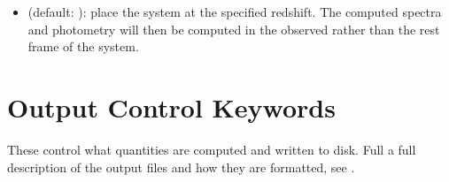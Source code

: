 \documentclass[letterpaper,10pt,english]{sphinxmanual}
\begin{document}
\begin{itemize}
\item {} 
 (default: ): place the system at the specified redshift. The computed spectra and photometry will then be computed in the observed rather than the rest frame of the system.

\end{itemize}


\section{Output Control Keywords}
\label{\detokenize{parameters:output-control-keywords}}
These control what quantities are computed and written to disk. Full a full description of the output files and how they are formatted, see {\hyperref[\detokenize{output:sec-output}]{}}.
\end{document}
